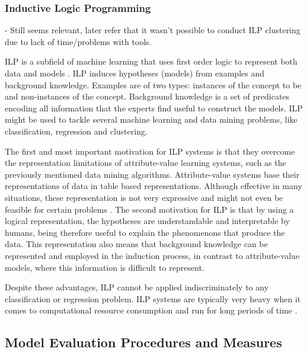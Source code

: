 \subsubsection*{Inductive Logic Programming}

\begin{Notes}
- Still seems relevant, later refer that it wasn't possible to conduct ILP
clustering due to lack of time/problems with tools.\\
\end{Notes}

ILP is a subfield of machine learning that uses first order logic to represent
both data and models \cite{Lavrac1998}. ILP induces hypotheses (models) from
examples and background knowledge. Examples are of two types: instances of the
concept to be  and non-instances of the concept. Background
knowledge is a set of predicates encoding all information that the experts find
useful to construct the models. ILP might be used to tackle several machine
learning and data mining problems, like classification, regression and
clustering.

The first and most important motivation for ILP systems is that they overcome
the representation limitations of attribute-value learning systems, such as the
previously mentioned data mining algorithms. Attribute-value systems base their
representations of data in table based representations. Although effective in
many situations, these representation is not very expressive and might not even
be feasible for certain problems \cite{Bratko:1995:AIL:219717.219771}. The
second motivation for ILP is that by using a logical representation, the
hypotheses are understandable and interpretable by humans, being therefore
useful to explain the phenomenons that produce the data. This representation
also means that background knowledge can be represented and employed in the
induction process, in contrast to attribute-value models, where this information
is difficult to represent.

Despite these advantages, ILP cannot be applied indiscriminately to any
classification or regression problem. ILP systems are typically very heavy when
it comes to computational resource consumption and run for long periods of time
\cite{fonseca2003implementation}.

\subsection{Model Evaluation Procedures and Measures}\label{sec:mineval}

